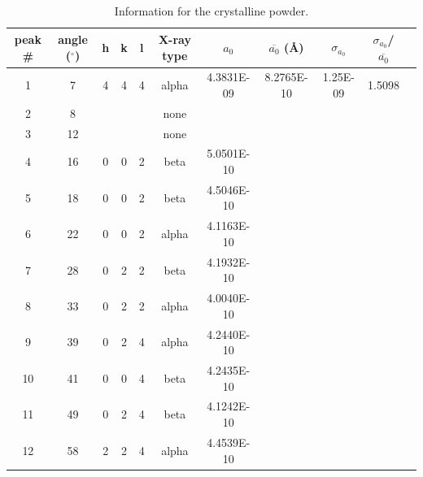 \documentclass[a4paper,12pt,english]{all-in-one} %
\begin{document}
\begin{table}[]
\centering
\begin{tabular}{c|c|c|c|c|c|c|c|c|c|c}
peak \# & angle ($^\circ$) & h & k & l & X-ray type & $a_0$ & $\overline{a_0}$ (\AA) & $\sigma_{a_0}$ & $\sigma_{a_0}$/$\overline{a_0}$  \\ \hline
1 & 7 & 4  & 4  & 4  & alpha & 4.3831E-09  & 8.2765E-10 & 1.25E-09 & 1.5098\\
2 & 8 & & &   & none & & & & \\
3 & 12 & & &   & none & & & & \\
4 & 16 & 0 & 0 & 2 & beta & 5.0501E-10 & & & \\
5 & 18 & 0 & 0 & 2 & beta & 4.5046E-10 & & & \\
6 & 22 & 0 & 0 & 2 & alpha & 4.1163E-10 & & & \\
7 & 28 & 0 & 2 & 2 & beta & 4.1932E-10 & & & \\
8 & 33 & 0 & 2 & 2 & alpha & 4.0040E-10 & & & \\
9 & 39 & 0 & 2 & 4 & alpha & 4.2440E-10 & & & \\
10 & 41 & 0 & 0 & 4 & beta & 4.2435E-10 & & & \\
11 & 49 & 0 & 2 & 4 & beta & 4.1242E-10 & & & \\
12 & 58 & 2 & 2 & 4 & alpha & 4.4539E-10 & & &        
\end{tabular}
\caption{Information for the  crystalline powder.}
\label{tab:powder}
\end{table}
\end{document}
